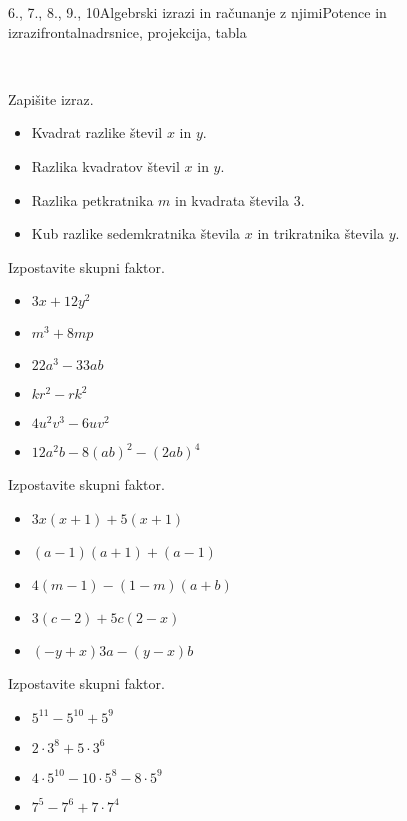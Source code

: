 \begin{priprava}{6., 7., 8., 9., 10}{}{Algebrski izrazi in računanje z njimi}{Potence in izrazi}{frontalna}{drsnice, projekcija, tabla}
\begin{multicols}{2}
~

\begin{naloga}
    Zapišite izraz.
    \begin{itemize}
        \item Kvadrat razlike števil $x$ in $y$. 
        \item Razlika kvadratov števil $x$ in $y$. 
        \item Razlika petkratnika $m$ in kvadrata števila $3$. 
        \item Kub razlike sedemkratnika števila $x$ in trikratnika števila $y$. 
    \end{itemize}
\end{naloga}



\begin{naloga}
    Izpostavite skupni faktor.
    \begin{itemize}
        \item $3x+12y^2$ 
        \item $m^3+8mp$ 
        \item $22a^3-33ab$ 
        \item $kr^2-rk^2$ 
        \item $4u^2v^3-6uv^2$ 
        \item $12a^2b-8(ab)^2-(2ab)^4$ 
    \end{itemize}
\end{naloga}



\begin{naloga}
    Izpostavite skupni faktor.
    \begin{itemize}
        \item $3x(x+1)+5(x+1)$ 
        \item $(a-1)(a+1)+(a-1)$ 
        \item $4(m-1)-(1-m)(a+b)$ 
        \item $3(c-2)+5c(2-x)$ 
        \item $(-y+x)3a-(y-x)b$ 
    \end{itemize}
\end{naloga}



\begin{naloga}
    Izpostavite skupni faktor.
    \begin{itemize}
        \item $5^{11}-5^{10}+5^9$ 
        \item $2\cdot 3^8+5\cdot 3^6$ 
        \item $4\cdot 5^{10}-10\cdot 5^8-8\cdot 5^9$ 
        \item $7^5-7^6+7\cdot 7^4$ 
    \end{itemize}
\end{naloga}




\end{multicols}
\end{priprava}
